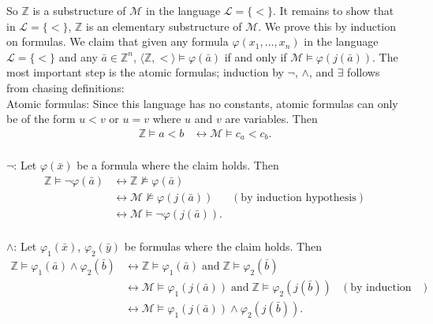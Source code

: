\documentclass{article}
\begin{document}
\begin{enumerate}
    So $\mathbb{Z}$ is a substructure of $\mathcal{M}$ in the language
    $\mathcal{L}=\{<\}$. It remains to show that in $\mathcal{L}=\{<\}$,
    $\mathbb{Z}$ is an elementary substructure of $\mathcal{M}$. We prove
    this by induction on formulas. We claim that given any formula
    $\varphi(x_1,\ldots,x_n)$ in the language $\mathcal{L}=\{<\}$ and any
    $\bar{a}\in\mathbb{Z}^n$,
    $\langle\mathbb{Z},<\rangle\models\varphi(\bar{a})$ if and only if
    $\mathcal{M}\models\varphi(j(\bar{a}))$. The most important step is the
    atomic formulas; induction by $\neg$, $\wedge$, and $\exists$ follows
    from chasing definitions: \\

    Atomic formulas: Since this language has no constants, atomic formulas
    can only be of the form $u<v$ or $u=v$ where $u$ and $v$ are variables.
    Then
    \begin{align*}
      \mathbb{Z}\models a<b &\leftrightarrow\mathcal{M}\models c_a<c_b. \\
    \end{align*}

    $\neg$: Let $\varphi(\bar{x})$ be a formula where the claim holds.
    Then
    \begin{align*}
      \mathbb{Z}\models\neg\varphi(\bar{a})
        &\leftrightarrow\mathbb{Z}\not\models\varphi(\bar{a}) & \\
        &\leftrightarrow\mathcal{M}\not\models\varphi(j(\bar{a}))  & (\text{by
          induction hypothesis}) \\
        &\leftrightarrow\mathcal{M}\models\neg\varphi(j(\bar{a})). & \\
    \end{align*}

    $\wedge$: Let $\varphi_1(\bar{x})$, $\varphi_2(\bar{y})$ be formulas
    where the claim holds. Then
    \begin{align*}
      \mathbb{Z}\models\varphi_1(\bar{a})\wedge\varphi_2(\bar{b})
        &\leftrightarrow\mathbb{Z}\models\varphi_1(\bar{a})\;\text{and}\;
        \mathbb{Z}\models\varphi_2(\bar{b})& \\
        &\leftrightarrow\mathcal{M}\models\varphi_1(j(\bar{a}))\;\text{and}\;
        \mathbb{Z}\models\varphi_2(j(\bar{b}))& (\text{by induction
        hypothesis}) \\
        &\leftrightarrow\mathcal{M}\models\varphi_1(j(\bar{a}))\wedge\varphi_2(j(\bar{b})). & \\
    \end{align*}


\end{enumerate}
\end{document}
